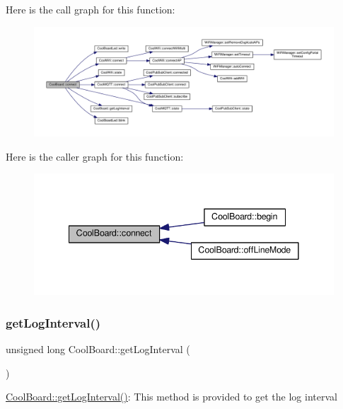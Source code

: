 Here is the call graph for this function\+:
\nopagebreak
\begin{figure}[H]
\begin{center}
\leavevmode
\includegraphics[width=350pt]{d7/df9/class_cool_board_a519de78b807f8ec6463ff484eb925918_cgraph}
\end{center}
\end{figure}
Here is the caller graph for this function\+:
\nopagebreak
\begin{figure}[H]
\begin{center}
\leavevmode
\includegraphics[width=341pt]{d7/df9/class_cool_board_a519de78b807f8ec6463ff484eb925918_icgraph}
\end{center}
\end{figure}
\mbox{\label{class_cool_board_a7508e029f2ee17bb747ffab599285e0d}} 
\subsubsection{\texorpdfstring{get\+Log\+Interval()}{getLogInterval()}}
{\footnotesize\ttfamily unsigned long Cool\+Board\+::get\+Log\+Interval (\begin{DoxyParamCaption}{ }\end{DoxyParamCaption})}

\hyperlink{class_cool_board_a7508e029f2ee17bb747ffab599285e0d}{Cool\+Board\+::get\+Log\+Interval()}\+: This method is provided to get the log interval

